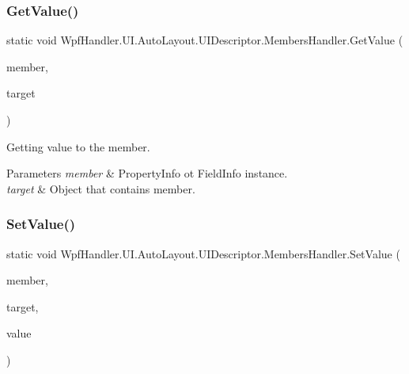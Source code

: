 \subsubsection{\texorpdfstring{Get\+Value()}{GetValue()}}
{\footnotesize\ttfamily static void Wpf\+Handler.\+U\+I.\+Auto\+Layout.\+U\+I\+Descriptor.\+Members\+Handler.\+Get\+Value (\begin{DoxyParamCaption}\item[{Member\+Info}]{member,  }\item[{object}]{target }\end{DoxyParamCaption})\hspace{0.3cm}{\ttfamily [static]}}



Getting value to the member. 


\begin{DoxyParams}{Parameters}
{\em member} & Property\+Info ot Field\+Info instance.\\
\hline
{\em target} & Object that contains member.\\
\hline
\end{DoxyParams}
\mbox{\label{class_wpf_handler_1_1_u_i_1_1_auto_layout_1_1_u_i_descriptor_1_1_members_handler_a1bd9d1aaca70397519f3043059bebb63}} 
\subsubsection{\texorpdfstring{Set\+Value()}{SetValue()}}
{\footnotesize\ttfamily static void Wpf\+Handler.\+U\+I.\+Auto\+Layout.\+U\+I\+Descriptor.\+Members\+Handler.\+Set\+Value (\begin{DoxyParamCaption}\item[{Member\+Info}]{member,  }\item[{object}]{target,  }\item[{object}]{value }\end{DoxyParamCaption})\hspace{0.3cm}{\ttfamily [static]}}



